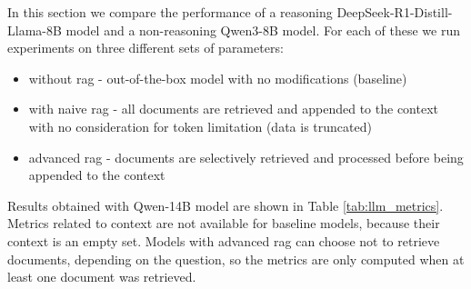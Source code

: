 \documentclass[fleqn,moreauthors,10pt]{ds_report}
\begin{document}
\begin{table}[t]
{}
\caption{Performance comparison as evaluated by GPT-4.1-mini model with DeepEval framework.}
\label{tab:gpt}
\end{table}

In this section we compare the performance of a reasoning DeepSeek-R1-Distill-Llama-8B \cite{deepseek3} model and a non-reasoning Qwen3-8B \cite{qwen3} model. For each of these we run experiments on three different sets of parameters:
\begin{itemize}
	\item without \ac{rag} - out-of-the-box model with no modifications (baseline)
	\item with naive \ac{rag} - all documents are retrieved and appended to the context with no consideration for token limitation (data is truncated)
	\item advanced \ac{rag} - documents are selectively retrieved and processed before being appended to the context
\end{itemize}

Results obtained with Qwen-14B model are shown in Table \ref{tab:llm_metrics}. Metrics related to context are not available for baseline models, because their context is an empty set. Models with advanced \ac{rag} can choose not to retrieve documents, depending on the question, so the metrics are only computed when at least one document was retrieved. 
\end{document}
